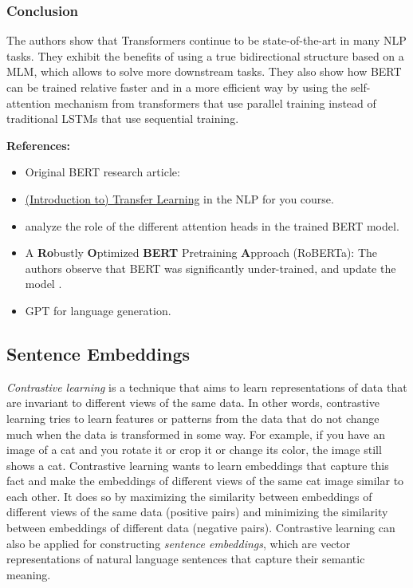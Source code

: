 \documentclass[11pt, a4paper]{amsart}
\begin{document}
\subsubsection{Conclusion}

The authors show that Transformers continue to be state-of-the-art in many NLP tasks. 
They exhibit the benefits of using a true bidirectional structure based on a MLM, which allows to solve more downstream tasks. 
They also show how BERT can be trained relative faster and in a more efficient way by using the self-attention mechanism from transformers that use parallel training instead of traditional LSTMs that use sequential training.

\noindent \textbf{References:}
\begin{itemize}
	\item Original BERT research article:  \cite{DBLP:journals/corr/abs-1810-04805}
	\item \href{https://lena-voita.github.io/nlp_course/transfer_learning.html}{(Introduction to) Transfer Learning} in the NLP for you course.
	\item \cite{clark-etal-2019-bert} analyze the role of the different attention heads in the trained BERT model.
	\item A \textbf{Ro}bustly \textbf{O}ptimized \textbf{BERT} Pretraining \textbf{A}pproach (RoBERTa):
	The authors observe that BERT was significantly under-trained, and update the model \cite{DBLP:journals/corr/abs-1907-11692}.
	\item GPT for language generation.
\end{itemize}

\subsection{Sentence Embeddings}

\emph{Contrastive learning} is a technique that aims to learn representations of data that are invariant to different views of the same data.
In other words, contrastive learning tries to learn features or patterns from the data that do not change much when the data is transformed in some way.
For example, if you have an image of a cat and you rotate it or crop it or change its color, the image still shows a cat. 
Contrastive learning wants to learn embeddings that capture this fact and make the embeddings of different views of the same cat image similar to each other.
It does so by maximizing the similarity between embeddings of different views of the same data (positive pairs) and minimizing the similarity between embeddings of different data (negative pairs).
Contrastive learning can also be applied for constructing \emph{sentence embeddings}, which are vector representations of natural language sentences that capture their semantic meaning.
\end{document}
